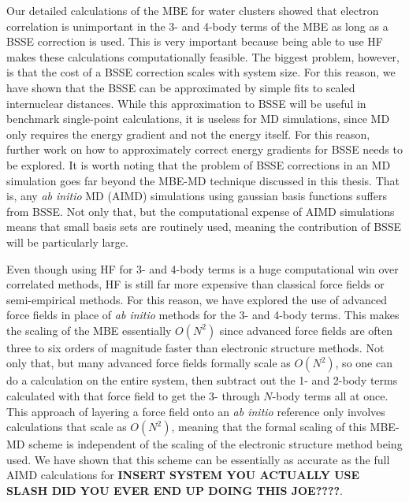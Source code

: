 \documentclass[11pt, proquest]{uwthesis}[2020/02/24]
\begin{document}
\par Our detailed calculations of the MBE for water clusters showed that electron correlation is unimportant in the 3- and 4-body terms of the MBE as long as a BSSE correction is used. This is very important because being able to use HF makes these calculations computationally feasible. The biggest problem, however, is that the cost of a BSSE correction scales with system size. For this reason, we have shown that the BSSE can be approximated by simple fits to scaled internuclear distances. While this approximation to BSSE will be useful in benchmark single-point calculations, it is useless for MD simulations, since MD only requires the energy gradient and not the energy itself. For this reason, further work on how to approximately correct energy gradients for BSSE needs to be explored. It is worth noting that the problem of BSSE corrections in an MD simulation goes far beyond the MBE-MD technique discussed in this thesis. That is, any \textit{ab initio} MD (AIMD) simulations using gaussian basis functions suffers from BSSE. Not only that, but the computational expense of AIMD simulations means that small basis sets are routinely used, meaning the contribution of BSSE will be particularly large.

\par Even though using HF for 3- and 4-body terms is a huge computational win over correlated methods, HF is still far more expensive than classical force fields or semi-empirical methods. For this reason, we have explored the use of advanced force fields in place of \textit{ab initio} methods for the 3- and 4-body terms. This makes the scaling of the MBE essentially $O(N^2)$ since advanced force fields are often three to six orders of magnitude faster than electronic structure methods. Not only that, but many advanced force fields formally scale as $O(N^2)$, so one can do a calculation on the entire system, then subtract out the 1- and 2-body terms calculated with that force field to get the 3- through $N$-body terms all at once. This approach of layering a force field onto an \textit{ab initio} reference only involves calculations that scale as $O(N^2)$, meaning that the formal scaling of this MBE-MD scheme is independent of the scaling of the electronic structure method being used. We have shown that this scheme can be essentially as accurate as the full AIMD calculations for \textbf{INSERT SYSTEM YOU ACTUALLY USE SLASH DID YOU EVER END UP DOING THIS JOE????}.
\end{document}
